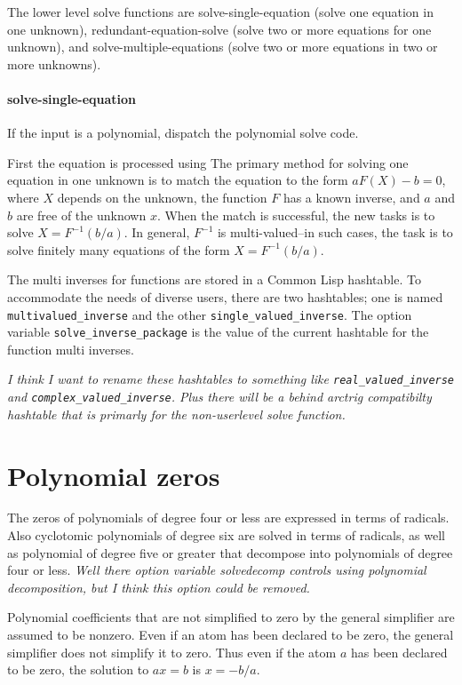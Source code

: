 \documentclass[]{scrartcl}
\newcommand{\multivaluedinverse}{\texttt{multivalued\_inverse}}
\newcommand{\singlevaluedinverse}{\texttt{single\_valued\_inverse}}
\newcommand{\solveinversepackage}{\texttt{solve\_inverse\_package}}
\begin{document}
The lower level solve functions are solve-single-equation (solve one equation in one unknown), redundant-equation-solve (solve two or more equations for one unknown), and solve-multiple-equations (solve two or more equations in two or more unknowns).

\paragraph{solve-single-equation} If the input is a polynomial, dispatch the polynomial solve code.

First the equation is processed using
The primary method for solving one equation in one unknown is to match the equation to the form \(a F(X) - b = 0\), where \(X\) depends on the unknown, the function \(F\) has a known inverse, and \(a\) and \(b\) are free of the unknown \(x\). When the match is successful, the new tasks is to solve \(X = F^{-1}(b/a) \). In general, \(F^{-1}\) is multi-valued--in such cases, the task is to solve finitely many equations of the form  \(X = F^{-1}(b/a) \).

The multi inverses for functions are stored in a Common Lisp hashtable. To accommodate the needs of diverse users,
there are two hashtables; one is named \multivaluedinverse\/ and the other \singlevaluedinverse.  The option
variable \solveinversepackage\/ is the value of the current hashtable for the function multi inverses.

\emph{I think I want to rename these hashtables to something like \texttt{real\_valued\_inverse}
and \texttt{complex\_valued\_inverse}. Plus there will be a behind arctrig compatibilty hashtable that is primarly for the non-userlevel solve function.}

\section{Polynomial zeros}

The zeros of polynomials of degree four or less are expressed in terms of radicals. Also  cyclotomic polynomials of degree six are solved in terms of radicals, as well as polynomial of degree five or greater that decompose into polynomials of degree four or less. \emph{Well there option variable solvedecomp controls using polynomial decomposition, but I think this option could be removed.}

\begin{alphalist}[]

\item  Polynomial coefficients that are not simplified to zero by the  general simplifier are assumed to be nonzero. Even if an atom has been declared to be zero, the general simplifier does not simplify  it to zero. Thus even if the atom \(a\) has been declared to be zero, the solution to \(a x = b\) is \(x = -b/a \).



\end{alphalist}
\end{document}
